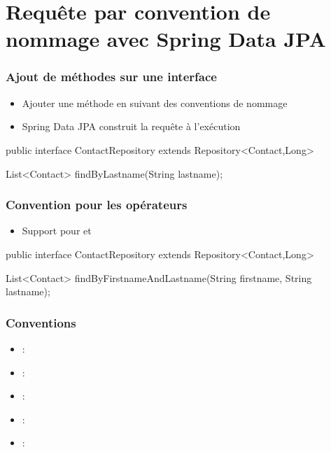 \section{Requête par convention de nommage avec Spring Data JPA}



\begin{frame}[fragile]
 \frametitle{Ajout de méthodes sur une interface}
 \begin{itemize}
  \item Ajouter une méthode en suivant des conventions de nommage
  \item Spring Data JPA construit la requête à l'exécution
 \end{itemize}
 \begin{javacode}
public interface ContactRepository extends Repository<Contact,Long> {

  List<Contact> findByLastname(String lastname);

}  
 \end{javacode}
\end{frame}

\begin{frame}[fragile]
 \frametitle{Convention pour les opérateurs}
 \begin{itemize}
  \item Support pour  et 
 \end{itemize}
 \begin{javacode}
public interface ContactRepository extends Repository<Contact,Long> {

  List<Contact> findByFirstnameAndLastname(String firstname, 
                                           String lastname);

}  
 \end{javacode}
\end{frame}

\begin{frame}
 \frametitle{Conventions}
 \begin{itemize}
  \item {} : 
  \item {} : 
  \item {} : 
  \item {} : 
  \item {} : 
 \end{itemize}
\end{frame}

